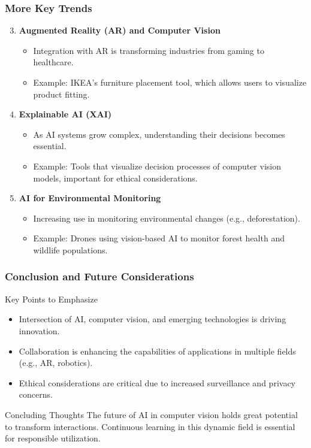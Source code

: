 \documentclass[aspectratio=169]{beamer}
\begin{document}
\begin{frame}[fragile]
    \frametitle{More Key Trends}
    \begin{enumerate}
        \setcounter{enumi}{2} %
        \item \textbf{Augmented Reality (AR) and Computer Vision}
            \begin{itemize}
                \item Integration with AR is transforming industries from gaming to healthcare.
                \item Example: IKEA's furniture placement tool, which allows users to visualize product fitting.
            \end{itemize}

        \item \textbf{Explainable AI (XAI)}
            \begin{itemize}
                \item As AI systems grow complex, understanding their decisions becomes essential.
                \item Example: Tools that visualize decision processes of computer vision models, important for ethical considerations.
            \end{itemize}

        \item \textbf{AI for Environmental Monitoring}
            \begin{itemize}
                \item Increasing use in monitoring environmental changes (e.g., deforestation).
                \item Example: Drones using vision-based AI to monitor forest health and wildlife populations.
            \end{itemize}
    \end{enumerate}
\end{frame}

\begin{frame}[fragile]
    \frametitle{Conclusion and Future Considerations}
    \begin{block}{Key Points to Emphasize}
        \begin{itemize}
            \item Intersection of AI, computer vision, and emerging technologies is driving innovation.
            \item Collaboration is enhancing the capabilities of applications in multiple fields (e.g., AR, robotics).
            \item Ethical considerations are critical due to increased surveillance and privacy concerns.
        \end{itemize}
    \end{block}

    \begin{block}{Concluding Thoughts}
        The future of AI in computer vision holds great potential to transform interactions. Continuous learning in this dynamic field is essential for responsible utilization.
    \end{block}
\end{frame}
\end{document}
